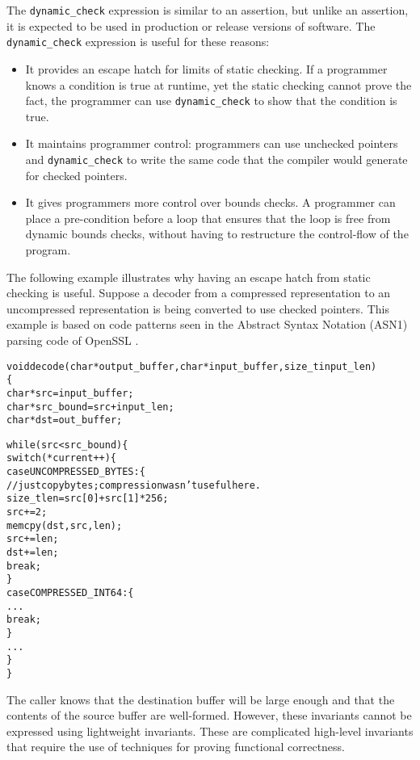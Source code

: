 The \texttt{dynamic\_check} expression is similar to an assertion, but
unlike an assertion, it is expected to be used in production or release
versions of software. The \texttt{dynamic\_check} expression is useful
for these reasons:

\begin{itemize}
\item
  It provides an escape hatch for limits of static checking. If a
  programmer knows a condition is true at runtime, yet the static
  checking cannot prove the fact, the programmer can use
  \texttt{dynamic\_check} to show that the condition is true.
\item
  It maintains programmer control: programmers can use unchecked pointers
  and \texttt{dynamic\_check} to write the same code that the compiler
  would generate for checked pointers.
\item
  It gives programmers more control over bounds checks. A programmer can
  place a pre-condition before a loop that ensures that the loop is free
  from dynamic bounds checks, without having to restructure the
  control-flow of the program.
\end{itemize}

The following example illustrates why having an escape hatch from static
checking is useful. Suppose a decoder from a compressed representation
to an uncompressed representation is being converted to use checked
pointers. This example is based on code patterns seen in the Abstract
Syntax Notation (ASN1) parsing code of OpenSSL \cite{OpenSSL2015}.

\begin{alltt}
void decode(char *output\_buffer, char *input\_buffer, size\_t input\_len)
\{
    char *src = input\_buffer;
    char *src\_bound = src + input\_len;
    char *dst = out\_buffer;

    while (src < src\_bound) \{
        switch (*current++) \{
            case UNCOMPRESSED\_BYTES: \{ 
                // just copy bytes; compression wasn't useful here.
                size_t len = src[0] + src[1]*256;
                src += 2;
                memcpy(dst, src, len);
                src += len;
                dst += len;
                break;
            \}
            case COMPRESSED\_INT64: \{
                ...
                break;
            \}
        ...
    \}
\}
\end{alltt}

The caller knows that the destination buffer will be large enough and
that the contents of the source buffer are well-formed. However, these
invariants cannot be expressed using lightweight invariants. These are
complicated high-level invariants that require the use of techniques for
proving functional correctness.

